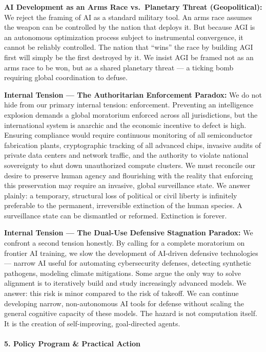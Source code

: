 \textbf{AI Development as an Arms Race vs.~Planetary Threat
(Geopolitical):} We reject the framing of AI as a standard military
tool. An arms race assumes the weapon can be controlled by the nation
that deploys it. But because AGI is an autonomous optimization process
subject to instrumental convergence, it cannot be reliably controlled.
The nation that ``wins'' the race by building AGI first will simply be
the first destroyed by it. We insist AGI be framed not as an arms race
to be won, but as a shared planetary threat --- a ticking bomb requiring
global coordination to defuse.

\textbf{Internal Tension --- The Authoritarian Enforcement Paradox:} We
do not hide from our primary internal tension: enforcement. Preventing
an intelligence explosion demands a global moratorium enforced across
all jurisdictions, but the international system is anarchic and the
economic incentive to defect is high. Ensuring compliance would require
continuous monitoring of all semiconductor fabrication plants,
cryptographic tracking of all advanced chips, invasive audits of private
data centers and network traffic, and the authority to violate national
sovereignty to shut down unauthorized compute clusters. We must
reconcile our desire to preserve human agency and flourishing with the
reality that enforcing this preservation may require an invasive, global
surveillance state. We answer plainly: a temporary, structural loss of
political or civil liberty is infinitely preferable to the permanent,
irreversible extinction of the human species. A surveillance state can
be dismantled or reformed. Extinction is forever.

\textbf{Internal Tension --- The Dual-Use Defensive Stagnation Paradox:}
We confront a second tension honestly. By calling for a complete
moratorium on frontier AI training, we slow the development of AI-driven
defensive technologies --- narrow AI useful for automating cybersecurity
defenses, detecting synthetic pathogens, modeling climate mitigations.
Some argue the only way to solve alignment is to iteratively build and
study increasingly advanced models. We answer: this risk is minor
compared to the risk of takeoff. We can continue developing narrow,
non-autonomous AI tools for defense without scaling the general
cognitive capacity of these models. The hazard is not computation
itself. It is the creation of self-improving, goal-directed agents.

\paragraph{5. Policy Program \& Practical
Action}\label{policy-program-practical-action}

